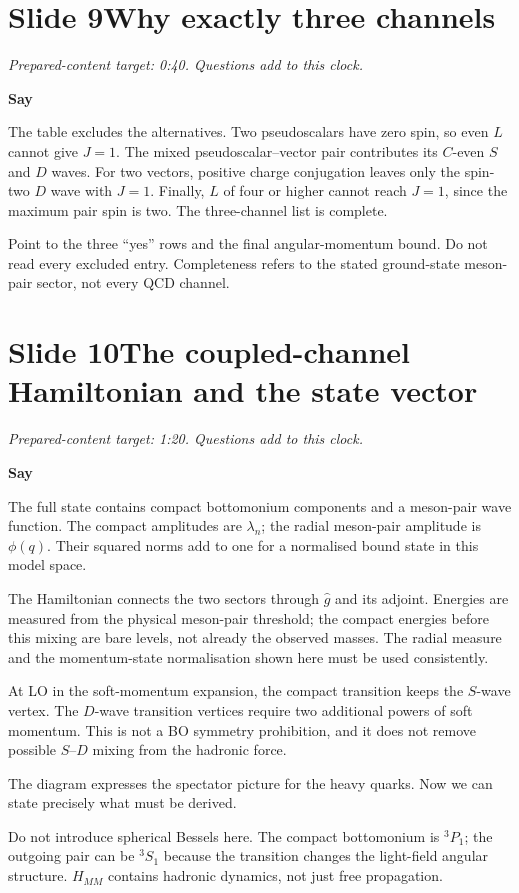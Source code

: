 \documentclass[11pt,a4paper]{article}
\newcommand{\cue}[1]{\begin{private}#1\end{private}}
\newenvironment{speech}{\par\textbf{Say}\par}{\par}
\newcommand{\slidenote}[3]{%
  \clearpage
  \pdfbookmark[1]{Slide #1}{slide-#1}%
  \section*{Slide #1\quad #2}
  \textit{Prepared-content target: #3. Questions add to this clock.}\par
}
\begin{document}
\slidenote{9}{Why exactly three channels}{0:40}
\begin{speech}
The table excludes the alternatives. Two pseudoscalars have zero spin,
so even $L$ cannot give $J=1$. The mixed pseudoscalar--vector pair
contributes its $C$-even $S$ and $D$ waves. For two vectors, positive
charge conjugation leaves only the spin-two $D$ wave with $J=1$.
Finally, $L$ of four or higher cannot reach $J=1$, since the maximum
pair spin is two. The three-channel list is complete.
\end{speech}
\cue{Point to the three ``yes'' rows and the final angular-momentum bound.
Do not read every excluded entry. Completeness refers to the stated
ground-state meson-pair sector, not every QCD channel.}

\slidenote{10}{The coupled-channel Hamiltonian and the state vector}{1:20}
\begin{speech}
The full state contains compact bottomonium components and a meson-pair
wave function. The compact amplitudes are $\lambda_n$; the radial
meson-pair amplitude is $\phi(q)$. Their squared norms add to one for
a normalised bound state in this model space.

The Hamiltonian connects the two sectors through $\hat g$ and its
adjoint. Energies are measured from the physical meson-pair threshold;
the compact energies before this mixing are bare levels, not already
the observed masses. The radial measure and the momentum-state
normalisation shown here must be used consistently.

At LO in the soft-momentum expansion, the compact transition keeps the
$S$-wave vertex. The $D$-wave transition vertices require two additional
powers of soft momentum. This is not a BO symmetry prohibition, and
it does not remove possible $S$--$D$ mixing from the hadronic force.

The diagram expresses the spectator picture for the heavy quarks.
Now we can state precisely what must be derived.
\end{speech}
\cue{Do not introduce spherical Bessels here. The compact bottomonium is
${}^3P_1$; the outgoing pair can be ${}^3S_1$ because the transition changes
the light-field angular structure. $H_{MM}$ contains hadronic dynamics,
not just free propagation.}
\end{document}
